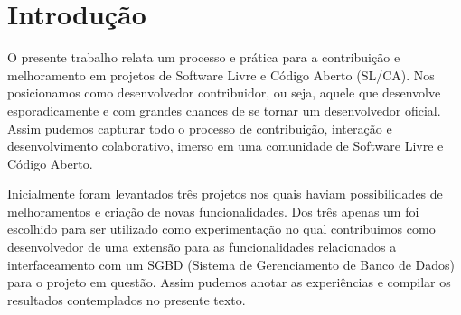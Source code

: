 % 
% 
% 
% 

\section{Introdução} \label{sec:introducao}

O presente trabalho relata um processo e prática para a contribuição e melhoramento em projetos de Software Livre e Código Aberto (SL/CA). Nos posicionamos como desenvolvedor contribuidor, ou seja, aquele que desenvolve esporadicamente e com grandes chances de se tornar um desenvolvedor oficial. Assim pudemos capturar todo o processo de contribuição, interação e desenvolvimento colaborativo, imerso em uma comunidade de Software Livre e Código Aberto.
 
Inicialmente foram levantados três projetos nos quais haviam possibilidades de melhoramentos e criação de novas funcionalidades. Dos três apenas um foi escolhido para ser utilizado como experimentação no qual contribuimos como desenvolvedor de uma extensão para as funcionalidades relacionados a interfaceamento com um SGBD (Sistema de Gerenciamento de Banco de Dados) para o projeto em questão. Assim pudemos anotar as experiências e compilar os resultados contemplados no presente texto.

